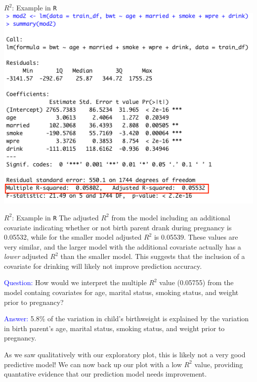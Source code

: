 \documentclass[10pt,t]{beamer}
\begin{document}
\begin{frame}{$R^2$: Example in \texttt{R}}
\centering \includegraphics[scale=0.4]{figures/r2_example2.png}
\end{frame}


\begin{frame}{$R^2$: Example in \texttt{R}}
The adjusted $R^2$ from the model including an additional covariate indicating whether or not birth parent drank during pregnancy is 0.05532, while for the smaller model adjusted $R^2$ is 0.05539. These values are very similar, and the larger model with the additional covariate actually has a \textit{lower} adjusted $R^2$ than the smaller model. This suggests that the inclusion of a covariate for drinking will likely not improve prediction accuracy. \pause

\vspace{0.3cm}

\textcolor{blue}{Question:} How would we interpret the multiple $R^2$ value (0.05755) from the model containg covariates for age, marital status, smoking status, and weight prior to pregnancy? \pause

\vspace{0.3cm}

\textcolor{blue}{Answer:} 5.8\% of the variation in child's birthweight is explained by the variation in birth parent's age, marital status, smoking status, and weight prior to pregnancy. 

\vspace{0.3cm}

\small *As we saw qualitatively with our exploratory plot, this is likely not a very good predictive model! We can now back up our plot with a low $R^2$ value, providing quantative evidence that our prediction model needs improvement.
\end{frame}
\end{document}
